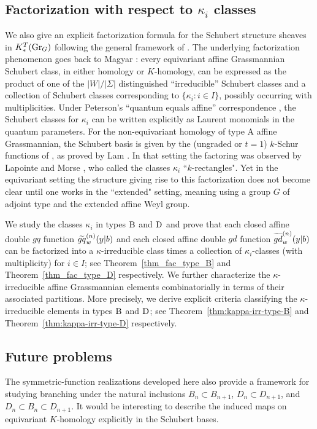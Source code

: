 \documentclass[a4paper]{amsart}
\theoremstyle{remark}
\numberwithin{equation}{section}
\begin{document}
\subsection{Factorization with respect to $\kappa_i$  classes}
We also give an explicit factorization formula for the Schubert structure sheaves in $K_*^T(\Gr_G)$ following the general framework of \cite{ISY}.
The underlying factorization phenomenon goes back to Magyar \cite{Mag}: every equivariant affine Grassmannian Schubert class, in either homology or \(K\)-homology, can be expressed as the product of one of the \(|W|/|\Sigma|\) distinguished ``irreducible'' Schubert classes and a collection of Schubert classes corresponding to \(\{\kappa_i: i\in I\}\), possibly occurring with multiplicities. Under Peterson's ``quantum equals affine'' correspondence \cite{Pet,LS}, the Schubert classes for \(\kappa_i\) can be written explicitly as Laurent monomials in the quantum parameters.
For the non-equivariant homology of type $\mathrm{A}$ affine Grassmannian, the Schubert basis is given by the (ungraded or $t=1$) $k$-Schur functions of \cite{LLM}, \cite{LM} as proved by Lam \cite{Lam}. In that setting the factoring was observed by Lapointe and Morse \cite{LM}, who called the classes $\kappa_i$ ``$k$-rectangles". Yet in the equivariant setting the structure giving rise to this factorization does not become clear until one works in the ``extended" setting, meaning using a group $G$ of adjoint type and the extended affine Weyl group.

We study the classes $\kappa_i$ in types $\B{}$ and $\D{}$ and prove that each closed affine double $gq$ function $\tgq{w}{n}(y| b)$ and each closed affine double $gd$ function $\tgd{w}{n}(y| b)$ can be factorized into a $\kappa$-irreducible class times a collection of $\kappa_i$-classes (with multiplicity) for $i\in I$; see Theorem~\ref{thm_fac_type_B} and Theorem~\ref{thm_fac_type_D} respectively. 
We further characterize the \(\kappa\)-irreducible affine Grassmannian elements combinatorially in terms of their associated partitions. More precisely, we derive explicit criteria classifying the \(\kappa\)-irreducible elements in types \(\B{}\) and \(\D{}\); see Theorem~\ref{thm:kappa-irr-type-B} and Theorem~\ref{thm:kappa-irr-type-D} respectively.
 \subsection{Future problems}
 The symmetric-function realizations developed here also provide
a framework for studying branching under the natural inclusions
$B_n\subset B_{n+1}$, $D_n\subset D_{n+1}$, and
$D_n\subset B_n\subset D_{n+1}$.
It would be interesting to describe the induced maps on
equivariant $K$-homology explicitly in the Schubert bases.
\end{document}

